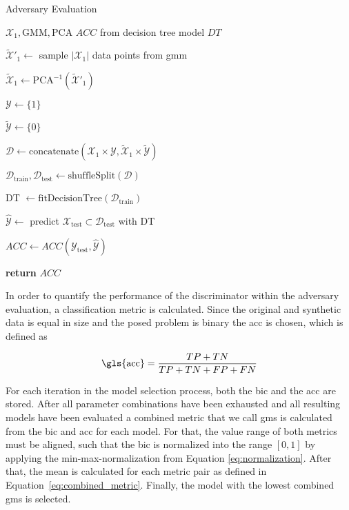 \documentclass[../../main.tex]{subfiles}
\begin{document}
\begin{algorithm}
    \caption{Adversary Evaluation}
    \label{alg:adversary_evaluation}
 
    \begin{algorithmic}[1]
        \REQUIRE $\mathcal{X}_1, \text{GMM}, \text{PCA}$
        \ENSURE $ACC$ from decision tree model $DT$

        \STATE $\tilde{\mathcal{X}}'_1 \leftarrow$ sample $|\mathcal{X}_1|$ data points from \gls{gmm}

        \STATE $\tilde{\mathcal{X}}_1 \leftarrow \text{PCA}^{-1}(\tilde{\mathcal{X}}'_1)$ 

        \STATE $\mathcal{Y} \leftarrow \{ 1 \}$
        
        \STATE $\tilde{\mathcal{Y}} \leftarrow \{ 0 \}$

        \STATE $\mathcal{D} \leftarrow \text{concatenate}(\mathcal{X}_1 \times \mathcal{Y}, \tilde{\mathcal{X}}_1 \times \tilde{\mathcal{Y}})$
        
        \STATE $\mathcal{D}_{\text{train}}, \mathcal{D}_{\text{test}} \leftarrow \text{shuffleSplit}(\mathcal{D})$

        \STATE DT $\leftarrow \text{fitDecisionTree}(\mathcal{D}_{\text{train}})$

        \STATE $\hat{\mathcal{Y}} \leftarrow$ predict $\mathcal{X}_{\text{test}} \subset \mathcal{D}_{\text{test}}$ with DT

        \STATE $ACC \leftarrow ACC(\mathcal{Y}_{\text{test}}, \hat{\mathcal{Y}})$

        \STATE \textbf{return} $ACC$
    \end{algorithmic}
 \end{algorithm}

In order to quantify the performance of the discriminator within the adversary evaluation, a classification metric is calculated. Since the original and synthetic data is equal in size and the posed problem is binary the \acrfull{acc} is chosen, which is defined as

 \begin{equation}
    \text{\gls{acc}} = \frac{TP + TN}{TP + TN + FP + FN}
 \end{equation}

 For each iteration in the model selection process, both the \gls{bic} and the \gls{acc} are stored. After all parameter combinations have been exhausted and all resulting models have been evaluated a combined metric that we call  \acrfull{gms} is calculated from the \gls{bic} and \gls{acc} for each model. For that, the value range of both metrics must be aligned, such that the \gls{bic} is normalized into the range $[0, 1]$ by applying the min-max-normalization from Equation \ref{eq:normalization}. After that, the mean is calculated for each metric pair as defined in Equation~\ref{eq:combined_metric}. Finally, the model with the lowest combined \gls{gms} is selected. 
 
\end{document}
